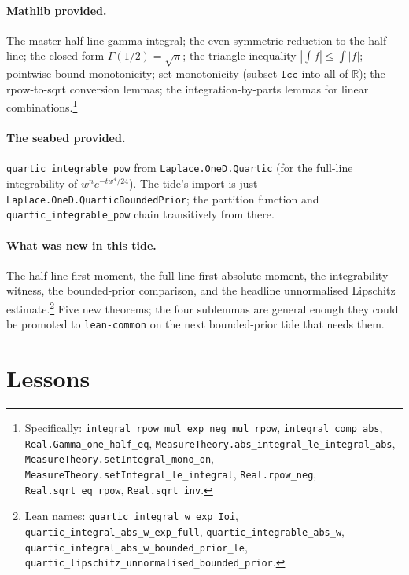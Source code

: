 \documentclass[11pt]{article}
\begin{document}
\paragraph{Mathlib provided.}
The master half-line gamma integral; the even-symmetric reduction to the
half line; the closed-form $\Gamma(1/2) = \sqrt{\pi}$; the triangle
inequality $|\int f| \le \int |f|$; pointwise-bound monotonicity; set
monotonicity (subset $\mathtt{Icc}$ into all of $\mathbb{R}$); the
rpow-to-sqrt conversion lemmas; the integration-by-parts lemmas for linear
combinations.\footnote{Specifically:
\texttt{integral\_rpow\_mul\_exp\_neg\_mul\_rpow},
\texttt{integral\_comp\_abs},
\texttt{Real.Gamma\_one\_half\_eq},
\texttt{MeasureTheory.abs\_integral\_le\_integral\_abs},
\texttt{MeasureTheory.setIntegral\_mono\_on},
\texttt{MeasureTheory.setIntegral\_le\_integral},
\texttt{Real.rpow\_neg}, \texttt{Real.sqrt\_eq\_rpow},
\texttt{Real.sqrt\_inv}.}

\paragraph{The seabed provided.}
\texttt{quartic\_integrable\_pow} from \texttt{Laplace.OneD.Quartic} (for
the full-line integrability of $w^n e^{-tw^4/24}$). The tide's import is
just \texttt{Laplace.OneD.QuarticBoundedPrior}; the partition function and
\texttt{quartic\_integrable\_pow} chain transitively from there.

\paragraph{What was new in this tide.}
The half-line first moment, the full-line first absolute moment, the
integrability witness, the bounded-prior comparison, and the headline
unnormalised Lipschitz estimate.\footnote{Lean names:
\texttt{quartic\_integral\_w\_exp\_Ioi},
\texttt{quartic\_integral\_abs\_w\_exp\_full},
\texttt{quartic\_integrable\_abs\_w},
\texttt{quartic\_integral\_abs\_w\_bounded\_prior\_le},
\texttt{quartic\_lipschitz\_unnormalised\_bounded\_prior}.}
Five new theorems; the four sublemmas are general enough they could be
promoted to \texttt{lean-common} on the next bounded-prior tide that needs
them.

\section{Lessons}
\end{document}
